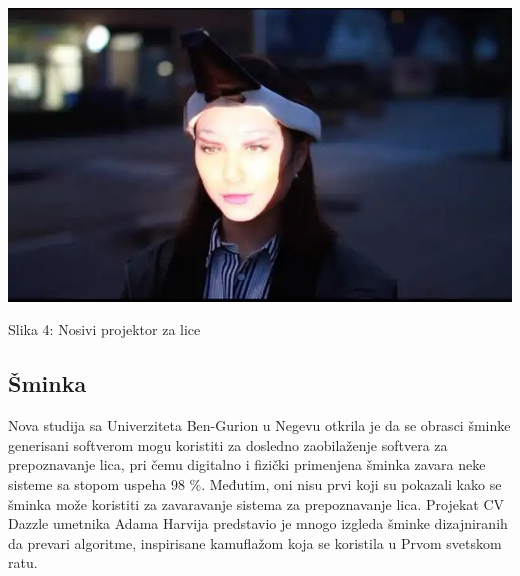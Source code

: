 \documentclass{article}
\begin{document}
\begin{center}
\begin{minipage}{0.5\textwidth}
\includegraphics[width=\textwidth]{projektor.jpg}
\end{minipage}

\vspace{0.5cm}

Slika 4: Nosivi projektor za lice
\end{center}

\subsection{Šminka}
Nova studija sa Univerziteta Ben-Gurion u Negevu otkrila je da se obrasci šminke generisani softverom mogu koristiti za dosledno zaobilaženje softvera za prepoznavanje lica, pri čemu digitalno i fizički primenjena šminka zavara neke sisteme sa stopom uspeha 98 \%.
\newline
\newline
Međutim, oni nisu prvi koji su pokazali kako se šminka može koristiti za zavaravanje sistema za prepoznavanje lica. Projekat CV Dazzle umetnika Adama Harvija predstavio je mnogo izgleda šminke dizajniranih da prevari algoritme, inspirisane kamuflažom koja se koristila u Prvom svetskom ratu.
\end{document}
